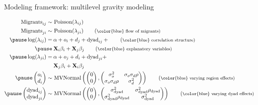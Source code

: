 \documentclass{beamer}
\begin{document}
\begin{frame}[fragile]{Modeling framework: multilevel gravity modeling}
\begin{small}
  \begin{align}
	\text{Migrants}_{ij} \sim & \text{ Poisson}(\lambda_{ij}) \notag \\
	\text{Migrants}_{ji} \sim & \text{ Poisson}(\lambda_{ji}) \tag{\footnotesize \color{blue} flow of migrants} \\ \pause
	\log(\lambda_{ij}) =  & \: \alpha + o_{i} + d_{j} + \text{dyad}_{ij} +\tag{\footnotesize
							\color{blue} correlation structure}  \\ \pause
							  & \: \mathbf{X}_{i}  \beta_{i}+ \mathbf{X}_{j} \beta_{j}  \tag{\footnotesize \color{blue} explanatory variables}  \\ \pause
	\log(\lambda_{ji}) =  & \: \alpha + o_{j} + d_{i} + \text{dyad}_{ji} + \notag \\
							  & \: \mathbf{X}_{j}  \beta_{i}+ \mathbf{X}_{i} \beta_{j} \notag  \\ \pause
	\left(\begin{matrix} 
		o_{i} \\
		d_{i}
	\end{matrix}\right) \sim& \text{ MVNormal}\left( \left( \begin{matrix}
	0 \\
	0 
	\end{matrix}\right) , \left(\begin{matrix}
	\sigma_o^2 & \sigma_o \sigma_d \rho \\
	 \sigma_o \sigma_d \rho  & \sigma_d^2
	\end{matrix}\right) \right)  \tag{\footnotesize \color{blue} varying region effects}  \\ \pause 	\left(\begin{matrix} 
		\text{dyad}_{ij} \\
		\text{dyad}_{ji}
	\end{matrix}\right) \sim& \text{ MVNormal}\left( \left( \begin{matrix}
	0 \\
	0 
	\end{matrix}\right) , \left(\begin{matrix}
	\sigma_{\text{dyad}}^2 & \sigma_{\text{dyad}}^2 \rho_{\text{dyad}} \\
	 \sigma_{\text{dyad}}^2 \rho_{\text{dyad}}  & \sigma_{\text{dyad}}^2
	\end{matrix}\right) \right)  \tag{\footnotesize \color{blue} varying dyad effects}
	\end{align}
\end{small}
\end{frame}
\end{document}
